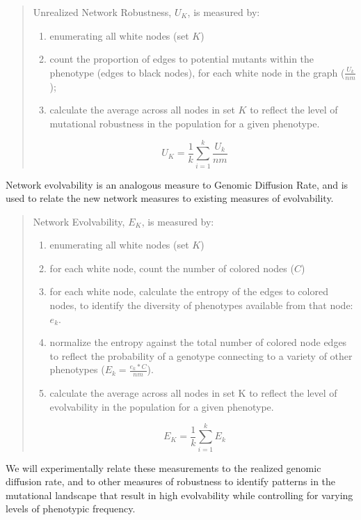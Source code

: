 \begin{quote}

Unrealized Network Robustness, $U_K$, is measured by:
\begin{enumerate}
\item enumerating all white nodes (set $K$)
\item count the proportion of edges to potential mutants within the phenotype (edges to black nodes), for each white node in the graph ($\frac{U_k}{nm}$);
\item calculate the average across all nodes in set $K$ to reflect the level of mutational robustness in the population for a given phenotype.
\end{enumerate}

\begin{equation}
U_{K} =  {\frac{1}{k} \sum_{i=1}^{k}}\frac{U_k}{nm} 
\end{equation}
\end{quote}

Network evolvability is an analogous measure to Genomic Diffusion Rate, and is used to relate the new network measures to existing measures of evolvability.

\begin{quote}


Network Evolvability, $E_K$, is measured by:
\begin{enumerate}
\item enumerating all white nodes (set $K$)
\item for each white node, count the number of colored nodes ($C$)
\item for each white node, calculate the entropy of the edges to colored nodes, to identify the diversity of phenotypes available from that node: $e_k$.
\item normalize the entropy against the total number of colored node edges to reflect the probability of a genotype connecting to a variety of other phenotypes ($E_k=\frac{{e_{k}}*C}{nm}$).
\item calculate the average across all nodes in set K to reflect the level of evolvability in the population for a given phenotype.
\end{enumerate}

\begin{equation}
E_{K} =  {\frac{1}{k} \sum_{i=1}^{k}} E_k 
\end{equation}

\end{quote}

We will experimentally relate these measurements to the realized genomic diffusion rate, and to other measures of robustness to identify patterns in the mutational landscape that result in high evolvability while controlling for varying levels of phenotypic frequency.